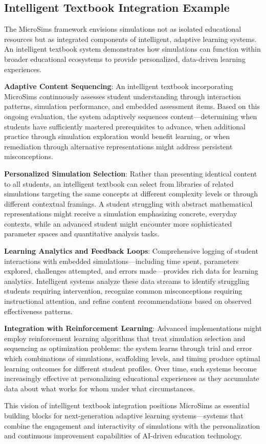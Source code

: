\subsection{Intelligent Textbook Integration Example}

The MicroSims framework envisions simulations not as isolated educational resources but as integrated components of intelligent, adaptive learning systems. An intelligent textbook system demonstrates how simulations can function within broader educational ecosystems to provide personalized, data-driven learning experiences.

\textbf{Adaptive Content Sequencing}: An intelligent textbook incorporating MicroSims continuously assesses student understanding through interaction patterns, simulation performance, and embedded assessment items. Based on this ongoing evaluation, the system adaptively sequences content---determining when students have sufficiently mastered prerequisites to advance, when additional practice through simulation exploration would benefit learning, or when remediation through alternative representations might address persistent misconceptions.

\textbf{Personalized Simulation Selection}: Rather than presenting identical content to all students, an intelligent textbook can select from libraries of related simulations targeting the same concepts at different complexity levels or through different contextual framings. A student struggling with abstract mathematical representations might receive a simulation emphasizing concrete, everyday contexts, while an advanced student might encounter more sophisticated parameter spaces and quantitative analysis tasks.

\textbf{Learning Analytics and Feedback Loops}: Comprehensive logging of student interactions with embedded simulations---including time spent, parameters explored, challenges attempted, and errors made---provides rich data for learning analytics. Intelligent systems analyze these data streams to identify struggling students requiring intervention, recognize common misconceptions requiring instructional attention, and refine content recommendations based on observed effectiveness patterns.

\textbf{Integration with Reinforcement Learning}: Advanced implementations might employ reinforcement learning algorithms that treat simulation selection and sequencing as optimization problems: the system learns through trial and error which combinations of simulations, scaffolding levels, and timing produce optimal learning outcomes for different student profiles. Over time, such systems become increasingly effective at personalizing educational experiences as they accumulate data about what works for whom under what circumstances.

This vision of intelligent textbook integration positions MicroSims as essential building blocks for next-generation adaptive learning systems---systems that combine the engagement and interactivity of simulations with the personalization and continuous improvement capabilities of AI-driven education technology.
